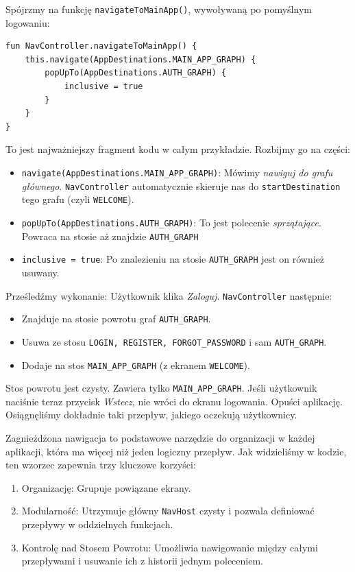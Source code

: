 Spójrzmy na funkcję \texttt{navigateToMainApp()}, wywoływaną po pomyślnym logowaniu:

\begin{verbatim}
fun NavController.navigateToMainApp() {
    this.navigate(AppDestinations.MAIN_APP_GRAPH) {
        popUpTo(AppDestinations.AUTH_GRAPH) {
            inclusive = true
        }
    }
}
\end{verbatim}

To jest najważniejszy fragment kodu w całym przykładzie. Rozbijmy go na części:
\begin{itemize}
\item \texttt{navigate(AppDestinations.MAIN\_APP\_GRAPH)}: Mówimy \textit{nawiguj do grafu głównego}. \texttt{NavController} automatycznie skieruje nas do \texttt{startDestination} tego grafu (czyli \texttt{WELCOME}).
\item \texttt{popUpTo(AppDestinations.AUTH\_GRAPH)}: To jest polecenie \textit{sprzątające}. Powraca na stosie aż znajdzie \texttt{AUTH\_GRAPH}
\item \texttt{inclusive = true}: Po znalezieniu na stosie \texttt{AUTH\_GRAPH} jest on również usuwany.
\end{itemize}

Prześledźmy wykonanie: Użytkownik klika \textit{Zaloguj}. \texttt{NavController} następnie:
\begin{itemize}
\item Znajduje na stosie powrotu graf \texttt{AUTH\_GRAPH}.
\item Usuwa ze stosu \texttt{LOGIN, REGISTER, FORGOT\_PASSWORD} i sam \texttt{AUTH\_GRAPH}.
\item Dodaje na stos \texttt{MAIN\_APP\_GRAPH} (z ekranem \texttt{WELCOME}).
\end{itemize}

Stos powrotu jest czysty. Zawiera tylko \texttt{MAIN\_APP\_GRAPH}. Jeśli użytkownik naciśnie teraz przycisk \textit{Wstecz}, nie wróci do ekranu logowania. Opuści aplikację. Osiągnęliśmy dokładnie taki przepływ, jakiego oczekują użytkownicy.

Zagnieżdżona nawigacja to podstawowe narzędzie do organizacji w każdej aplikacji, która ma więcej niż jeden logiczny przepływ. Jak widzieliśmy w kodzie, ten wzorzec zapewnia trzy kluczowe korzyści:
\begin{enumerate}
\item Organizację: Grupuje powiązane ekrany.
\item Modularność: Utrzymuje główny \texttt{NavHost} czysty i pozwala definiować przepływy w oddzielnych funkcjach.
\item Kontrolę nad Stosem Powrotu: Umożliwia nawigowanie między całymi przepływami i usuwanie ich z historii jednym poleceniem.
\end{enumerate}


